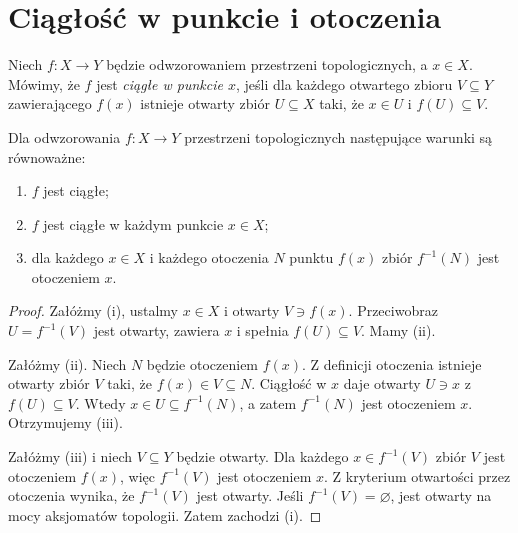\section{Ciągłość w punkcie i otoczenia}
\label{sec:topog-ciaglosc-lokalna}

\begin{definicja}
\label{def:topog-ciaglosc-w-punkcie}
Niech $f\colon X\to Y$ będzie odwzorowaniem przestrzeni
topologicznych, a $x\in X$. Mówimy, że $f$ jest
\emph{ciągłe w punkcie $x$}, jeśli dla każdego otwartego
zbioru $V\subseteq Y$ zawierającego $f(x)$ istnieje
otwarty zbiór $U\subseteq X$ taki, że
$x\in U$ i $f(U)\subseteq V$.
\end{definicja}

\begin{twierdzenie}
\label{thm:topog-ciaglosc-punktowa-globalna}
Dla odwzorowania $f\colon X\to Y$ przestrzeni topologicznych
następujące warunki są równoważne:
\begin{enumerate}[label=(\roman*)]
\item $f$ jest ciągłe;
\item $f$ jest ciągłe w każdym punkcie $x\in X$;
\item dla każdego $x\in X$ i każdego otoczenia $N$
      punktu $f(x)$ zbiór $f^{-1}(N)$ jest otoczeniem $x$.
\end{enumerate}
\end{twierdzenie}
\begin{proof}
Załóżmy (i), ustalmy $x\in X$ i otwarty $V\ni f(x)$.
Przeciwobraz $U=f^{-1}(V)$ jest otwarty, zawiera $x$
i spełnia $f(U)\subseteq V$. Mamy (ii).

Załóżmy (ii). Niech $N$ będzie otoczeniem $f(x)$.
Z definicji otoczenia istnieje otwarty zbiór $V$ taki,
że $f(x)\in V\subseteq N$. Ciągłość w $x$ daje otwarty
$U\ni x$ z $f(U)\subseteq V$. Wtedy
$x\in U\subseteq f^{-1}(N)$, a zatem $f^{-1}(N)$
jest otoczeniem $x$. Otrzymujemy (iii).

Załóżmy (iii) i niech $V\subseteq Y$ będzie otwarty.
Dla każdego $x\in f^{-1}(V)$ zbiór $V$ jest otoczeniem
$f(x)$, więc $f^{-1}(V)$ jest otoczeniem $x$.
Z kryterium otwartości przez otoczenia wynika,
że $f^{-1}(V)$ jest otwarty. Jeśli $f^{-1}(V)=\varnothing$,
jest otwarty na mocy aksjomatów topologii.
Zatem zachodzi (i).
\end{proof}

